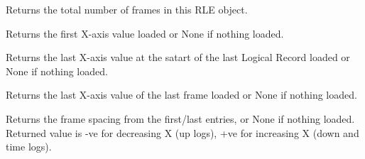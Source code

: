\documentclass[letterpaper,10pt,english]{sphinxmanual}
\begin{document}
\begin{fulllineitems}
\begin{fulllineitems}
\end{fulllineitems}


\begin{fulllineitems}
\label{\detokenize{ref/LIS/core/Rle:TotalDepth.LIS.core.Rle.RLEType01.totalFrames}}
Returns the total number of frames in this RLE object.

\end{fulllineitems}


\begin{fulllineitems}
\label{\detokenize{ref/LIS/core/Rle:TotalDepth.LIS.core.Rle.RLEType01.xAxisFirst}}
Returns the first X-axis value loaded or None if nothing loaded.

\end{fulllineitems}


\begin{fulllineitems}
\label{\detokenize{ref/LIS/core/Rle:TotalDepth.LIS.core.Rle.RLEType01.xAxisLast}}
Returns the last X-axis value at the satart of the last Logical Record loaded or None if nothing loaded.

\end{fulllineitems}


\begin{fulllineitems}
\label{\detokenize{ref/LIS/core/Rle:TotalDepth.LIS.core.Rle.RLEType01.xAxisLastFrame}}
Returns the last X-axis value of the last frame loaded or None if nothing loaded.

\end{fulllineitems}


\begin{fulllineitems}
\label{\detokenize{ref/LIS/core/Rle:TotalDepth.LIS.core.Rle.RLEType01.frameSpacing}}
Returns the frame spacing from the first/last entries, or None if nothing loaded.
Returned value is -ve for decreasing X (up logs), +ve for increasing X
(down and time logs).

\end{fulllineitems}


\end{fulllineitems}
\end{document}
